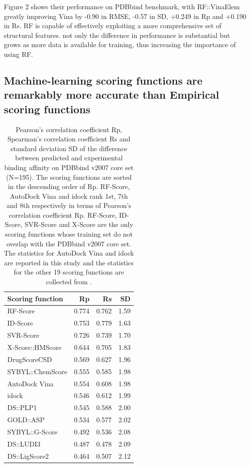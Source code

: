 \documentclass[journal=jacsat,manuscript=article]{achemso}
\begin{document}
Figure 2 shows their performance on PDBbind benchmark, with RF::VinaElem greatly improving Vina by -0.90 in RMSE, -0.57 in SD, +0.249 in Rp and +0.190 in Rs.
RF is capable of effectively exploiting a more comprehensive set of structural features.
not only the difference in performance is substantial but grows as more data is available for training, thus increasing the importance of using RF.

\subsection{Machine-learning scoring functions are remarkably more accurate than Empirical scoring functions}

\begin{table}
\caption{Pearson's correlation coefficient Rp, Spearman's correlation coefficient Rs and standard deviation SD of the difference between predicted and experimental binding affinity on PDBbind v2007 core set (N=195). The scoring functions are sorted in the descending order of Rp. RF-Score, AutoDock Vina and idock rank 1st, 7th and 8th respectively in terms of Pearson's correlation coefficient Rp. RF-Score, ID-Score, SVR-Score and X-Score are the only scoring functions whose training set do not overlap with the PDBbind v2007 core set. The statistics for AutoDock Vina and idock are reported in this study and the statistics for the other 19 scoring functions are collected from \cite{1313,564,1305,1295}.}
\label{tbl:sf}
\begin{tabular}{lrrr}
\hline
Scoring function & Rp & Rs & SD\\
\hline
RF-Score & 0.774 & 0.762 & 1.59\\
ID-Score & 0.753 & 0.779 & 1.63\\
SVR-Score & 0.726 & 0.739 & 1.70\\
X-Score::HMScore & 0.644 & 0.705 & 1.83\\
DrugScoreCSD & 0.569 & 0.627 & 1.96\\
SYBYL::ChemScore & 0.555 & 0.585 & 1.98\\
AutoDock Vina & 0.554 & 0.608 & 1.98\\
idock & 0.546 & 0.612 & 1.99\\
DS::PLP1 & 0.545 & 0.588 & 2.00\\
GOLD::ASP & 0.534 & 0.577 & 2.02\\
SYBYL::G-Score & 0.492 & 0.536 & 2.08\\
DS::LUDI3 & 0.487 & 0.478 & 2.09\\
DS::LigScore2 & 0.464 & 0.507 & 2.12\\

\end{tabular}
\end{table}
\end{document}
